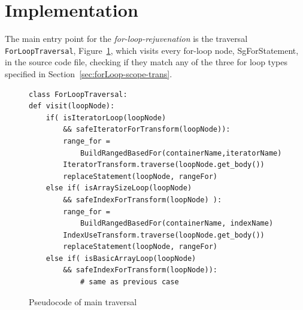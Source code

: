 \documentclass[bsc,frontabs,singlespacing,twoside,parskip,deptreport]{infthesis}
\begin{document}

    

\section{Implementation}





The main entry point for the \textit{for-loop-rejuvenation} is the traversal \texttt{ForLoopTraversal}, Figure~\ref{fig:pse-code-main-trav}, which visits every for-loop node, SgForStatement, in the source code file, checking if they match any of the three for loop types specified in Section~\ref{sec:forLoop-scope-trans}.

\begin{figure}[H]
    \centering
    \begin{verbatim}
class ForLoopTraversal:
def visit(loopNode):
    if( isIteratorLoop(loopNode) 
        && safeIteratorForTransform(loopNode)):
        range_for = 
            BuildRangedBasedFor(containerName,iteratorName)
        IteratorTransform.traverse(loopNode.get_body())
        replaceStatement(loopNode, rangeFor)
    else if( isArraySizeLoop(loopNode) 
        && safeIndexForTransform(loopNode) ):
        range_for = 
            BuildRangedBasedFor(containerName, indexName)
        IndexUseTransform.traverse(loopNode.get_body())
        replaceStatement(loopNode, rangeFor)
    else if( isBasicArrayLoop(loopNode) 
        && safeIndexForTransform(loopNode)):
            # same as previous case
    \end{verbatim}
    \caption{Pseudocode of main traversal}
    \label{fig:pse-code-main-trav}
\end{figure}
\end{document}
